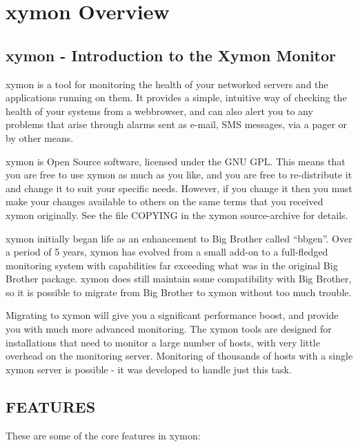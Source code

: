 %
\chapter{xymon Overview}
%
\section{xymon - Introduction to the Xymon Monitor}

 xymon is a tool for monitoring the health of your networked servers
 and the applications running on them. It provides a simple, intuitive
 way of checking the health of your systems from a webbrowser, and can
 also alert you to any problems that arise through alarms sent as
 e-mail, SMS messages, via a pager or by other means. 


 xymon is Open Source software, licensed under the GNU GPL. This
 means that you are free to use xymon as much as you like, and you
 are free to re-distribute it and change it to suit your specific
 needs. However, if you change it then you must make your changes
 available to others on the same terms that you received xymon
 originally. See the file COPYING in the xymon source-archive for
 details. 

 xymon initially began life as an enhancement to Big Brother called
 ``bbgen''. Over a period of 5 years, xymon has evolved from a small
 add-on to a full-fledged monitoring system with capabilities far
 exceeding what was in the original Big Brother package. xymon does
 still maintain some compatibility with Big Brother, so it is
 possible to migrate from Big Brother to xymon without too much
 trouble. 

 Migrating to xymon will give you a significant performance boost,
 and provide you with much more advanced monitoring. The xymon tools
 are designed for installations that need to monitor a large number
 of hosts, with very little overhead on the monitoring
 server. Monitoring of thousands of hosts with a single xymon server
 is possible - it was developed to handle just this task. 

\section{FEATURES}
 These are some of the core features in xymon: 


